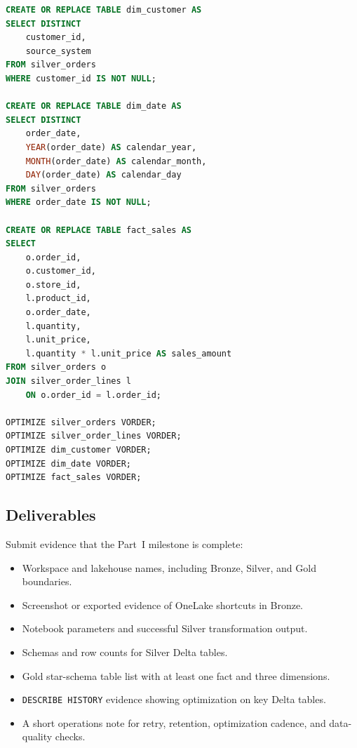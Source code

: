 \begin{lstlisting}[language=SQL,caption={Gold star schema and V-Order optimization.},label={lst:chapter4-capstone-gold-sql}]
CREATE OR REPLACE TABLE dim_customer AS
SELECT DISTINCT
    customer_id,
    source_system
FROM silver_orders
WHERE customer_id IS NOT NULL;

CREATE OR REPLACE TABLE dim_date AS
SELECT DISTINCT
    order_date,
    YEAR(order_date) AS calendar_year,
    MONTH(order_date) AS calendar_month,
    DAY(order_date) AS calendar_day
FROM silver_orders
WHERE order_date IS NOT NULL;

CREATE OR REPLACE TABLE fact_sales AS
SELECT
    o.order_id,
    o.customer_id,
    o.store_id,
    l.product_id,
    o.order_date,
    l.quantity,
    l.unit_price,
    l.quantity * l.unit_price AS sales_amount
FROM silver_orders o
JOIN silver_order_lines l
    ON o.order_id = l.order_id;

OPTIMIZE silver_orders VORDER;
OPTIMIZE silver_order_lines VORDER;
OPTIMIZE dim_customer VORDER;
OPTIMIZE dim_date VORDER;
OPTIMIZE fact_sales VORDER;
\end{lstlisting}

\subsection*{Deliverables}
Submit evidence that the Part~I milestone is complete:
\begin{itemize}
    \item Workspace and lakehouse names, including Bronze, Silver, and Gold boundaries.
    \item Screenshot or exported evidence of OneLake shortcuts in Bronze.
    \item Notebook parameters and successful Silver transformation output.
    \item Schemas and row counts for Silver Delta tables.
    \item Gold star-schema table list with at least one fact and three dimensions.
    \item \texttt{DESCRIBE HISTORY} evidence showing optimization on key Delta tables.
    \item A short operations note for retry, retention, optimization cadence, and data-quality checks.
\end{itemize}

